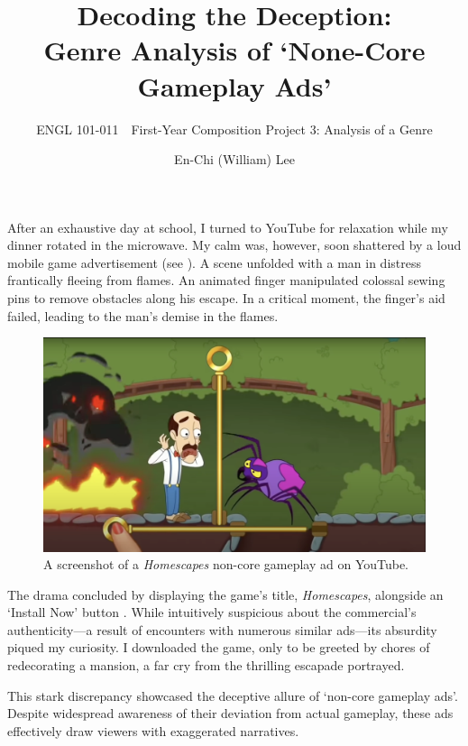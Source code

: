 \documentclass[a4paper, 12pt, mla]{homework}
\title[Genre Analysis of `None-Core Gameplay Ads']{Decoding the Deception: \\[0.1\baselineskip] Genre Analysis of `None-Core Gameplay Ads'}
\subtitle{ENGL 101-011\ \ First-Year Composition \linebreak Project 3: Analysis of a Genre}
\author{En-Chi (William) Lee}
\begin{document}
\maketitle

\noindent
After an exhaustive day at school, I turned to YouTube for relaxation while my dinner rotated in the microwave. 
My calm was, however, soon shattered by a loud mobile game advertisement (see ). 
A scene unfolded with a man in distress frantically fleeing from flames. 
An animated finger manipulated colossal sewing pins to remove obstacles along his escape. 
In a critical moment, the finger's aid failed, leading to the man's demise in the flames.

\begin{figure}[htb]\centering
	\includegraphics[width=0.9\linewidth]{Homescapes-Spider.png}
	\captionsetup{width=0.9\linewidth}
	\caption{A screenshot of a \textit{Homescapes} non-core gameplay ad on YouTube. \protect\cite{DG:Homescapes, YT:Homescapes-Spider}}
	\label{FIG:HS-PtP}
\end{figure}

The drama concluded by displaying the game's title, \textit{Homescapes}, alongside an `Install Now' button \cite{DG:Homescapes}. 
While intuitively suspicious about the commercial's authenticity---a result of encounters with numerous similar ads---its absurdity piqued my curiosity. 
I downloaded the game, only to be greeted by chores of redecorating a mansion, a far cry from the thrilling escapade portrayed.

This stark discrepancy showcased the deceptive allure of `non-core gameplay ads'. 
Despite widespread awareness of their deviation from actual gameplay, these ads effectively draw viewers with exaggerated narratives.
\end{document}
